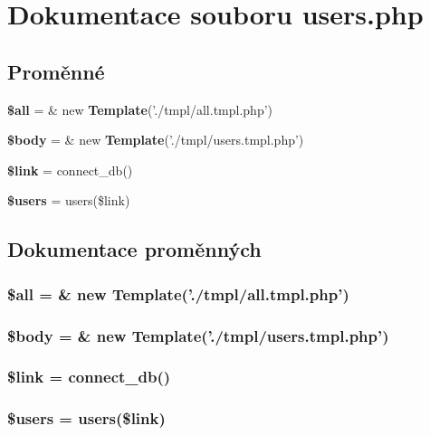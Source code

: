 \section{Dokumentace souboru users.php}
\label{users_8php}
\subsection*{Proměnné}
\begin{CompactItemize}
\item 
{\bf \$all} = \& new {\bf Template}('./tmpl/all.tmpl.php')
\item 
{\bf \$body} = \& new {\bf Template}('./tmpl/users.tmpl.php')
\item 
{\bf \$link} = connect\_\-db()
\item 
{\bf \$users} = users(\$link)
\end{CompactItemize}


\subsection{Dokumentace proměnných}
\subsubsection{\setlength{\rightskip}{0pt plus 5cm}\$all = \& new {\bf Template}('./tmpl/all.tmpl.php')}\label{users_8php_3c74ea9d2348c9aba28d36e692bef2d2}


\subsubsection{\setlength{\rightskip}{0pt plus 5cm}\$body = \& new {\bf Template}('./tmpl/users.tmpl.php')}\label{users_8php_26b9f9373f7bb79dfcf8a86dff086b45}


\subsubsection{\setlength{\rightskip}{0pt plus 5cm}\$link = connect\_\-db()}\label{users_8php_5d346e31b75d916e3bac9cb193bfc97f}


\subsubsection{\setlength{\rightskip}{0pt plus 5cm}\$users = users(\$link)}\label{users_8php_28005d22fa7ef2dfe215ad886b497d9c}


